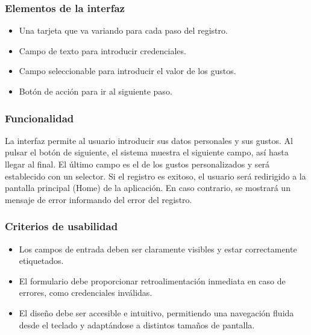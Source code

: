 \subsubsection{Elementos de la interfaz}
\begin{itemize}
  \item Una tarjeta que va variando para cada paso del registro.
  \item Campo de texto para introducir credenciales.
  \item Campo seleccionable para introducir el valor de los gustos.
  \item Botón de acción para ir al siguiente paso.
\end{itemize}

\subsubsection{Funcionalidad}
La interfaz permite al usuario introducir sus datos personales y sus gustos. Al pulsar el botón de siguiente, el sistema muestra el siguiente campo, así hasta llegar al final. El último campo es el de los gustos personalizados y será establecido con un selector. Si el registro es exitoso, el usuario será redirigido a la pantalla principal (Home) de la aplicación. En caso contrario, se mostrará un mensaje de error informando del error del registro.

\subsubsection{Criterios de usabilidad}
\begin{itemize}
  \item Los campos de entrada deben ser claramente visibles y estar correctamente etiquetados.
  \item El formulario debe proporcionar retroalimentación inmediata en caso de errores, como credenciales inválidas.
  \item El diseño debe ser accesible e intuitivo, permitiendo una navegación fluida desde el teclado y adaptándose a distintos tamaños de pantalla.
\end{itemize}

